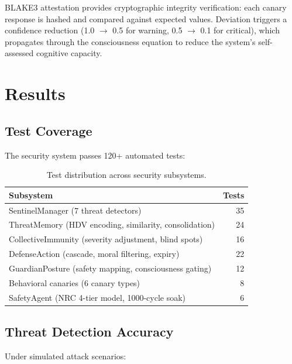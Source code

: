 \documentclass[11pt,a4paper]{article}
\begin{document}
BLAKE3 attestation provides cryptographic integrity verification: each canary response is hashed and compared against expected values. Deviation triggers a confidence reduction (1.0 $\to$ 0.5 for warning, 0.5 $\to$ 0.1 for critical), which propagates through the consciousness equation to reduce the system's self-assessed cognitive capacity.

\section{Results}

\subsection{Test Coverage}

The security system passes 120+ automated tests:

\begin{table}[h]
\centering
\caption{Test distribution across security subsystems.}
\label{tab:security_tests}
\begin{tabular}{lr}
\toprule
\textbf{Subsystem} & \textbf{Tests} \\
\midrule
SentinelManager (7 threat detectors) & 35 \\
ThreatMemory (HDV encoding, similarity, consolidation) & 24 \\
CollectiveImmunity (severity adjustment, blind spots) & 16 \\
DefenseAction (cascade, moral filtering, expiry) & 22 \\
GuardianPosture (safety mapping, consciousness gating) & 12 \\
Behavioral canaries (6 canary types) & 8 \\
SafetyAgent (NRC 4-tier model, 1000-cycle soak) & 6 \\
\bottomrule
\end{tabular}
\end{table}

\subsection{Threat Detection Accuracy}

Under simulated attack scenarios:
\end{document}
